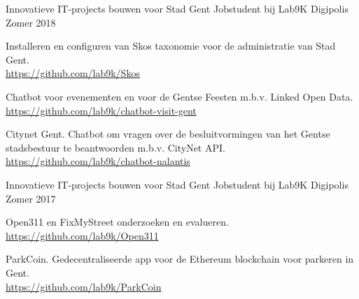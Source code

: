 

\begin{cventries}

  \cventry
    {Innovatieve IT-projects bouwen voor Stad Gent} %
    {Jobstudent bij Lab9K} %
    {Digipolis} %
    {Zomer 2018} %
    {
      \begin{cvitems} %
        \item Installeren en configuren van Skos taxonomie voor de administratie van Stad Gent. \\
        \url{https://github.com/lab9k/Skos}
  		\item Chatbot voor evenementen en voor de Gentse Feesten m.b.v. Linked Open Data. \\
  	    \url{https://github.com/lab9k/chatbot-visit-gent}
  		\item Citynet Gent.
        Chatbot om vragen over de besluitvormingen van het Gentse stadsbestuur te beantwoorden m.b.v. CityNet API. \\
  		\url{https://github.com/lab9k/chatbot-nalantis}
      \end{cvitems}
    }

  \cventry
    {Innovatieve IT-projects bouwen voor Stad Gent} %
    {Jobstudent bij Lab9K} %
    {Digipolis} %
    {Zomer 2017} %
    {
      \begin{cvitems} %
        \item Open311 en FixMyStreet onderzoeken en evalueren.\\
        \url{https://github.com/lab9k/Open311}
        \item ParkCoin.
        Gedecentraliseerde app voor de Ethereum blockchain voor parkeren in Gent. \\
  	    \url{https://github.com/lab9k/ParkCoin}
      \end{cvitems}
    }

\end{cventries}
